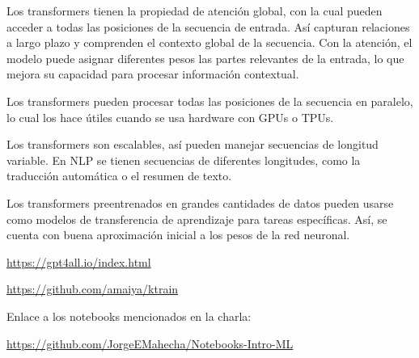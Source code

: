 \documentclass[10pd,hyperref={colorlinks=true}]{beamer}
\begin{document}

 \begin{frame}{}

Los transformers tienen la propiedad de atención global, con la cual 
pueden acceder a todas las posiciones de la secuencia de entrada. Así 
capturan relaciones a largo plazo y comprenden el contexto global de la 
secuencia. Con la atención, el modelo puede asignar diferentes pesos las 
partes relevantes de la entrada, lo que mejora su capacidad para 
procesar información contextual.

Los transformers pueden procesar todas las posiciones de la secuencia en 
paralelo, lo cual los hace útiles cuando se usa hardware con GPUs o 
TPUs.

Los transformers son escalables, así pueden manejar secuencias de 
longitud variable. En NLP se tienen secuencias de diferentes longitudes, 
como la traducción automática o el resumen de texto.

Los transformers preentrenados en grandes cantidades de datos pueden 
usarse como modelos de transferencia de aprendizaje para tareas 
específicas. Así, se cuenta con buena aproximación inicial a los pesos 
de la red neuronal.

 \vfill

\end{frame}


\begin{frame}{}

 \vfill

\centerline{\url{https://gpt4all.io/index.html}}

 \vfill

\centerline{\url{https://github.com/amaiya/ktrain}}

 \vfill

\centerline{Enlace a los notebooks mencionados en la charla:}

\centerline{\url{https://github.com/JorgeEMahecha/Notebooks-Intro-ML}}

 \vfill

 \end{frame}


 
\end{document}
